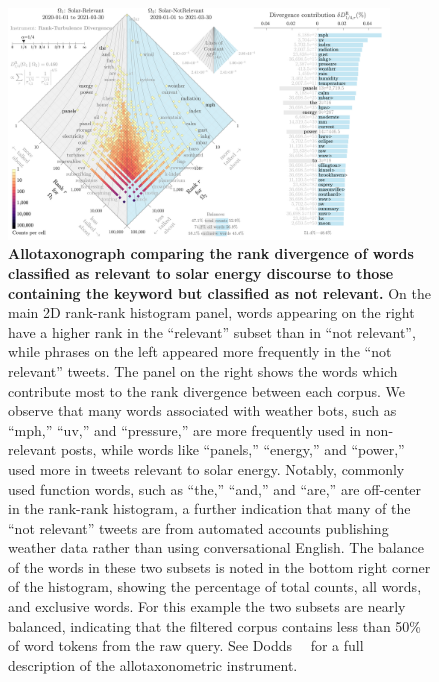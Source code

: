 \begin{figure}
  \centering	
    \includegraphics[width=0.90\textwidth]{figures/figallotaxonometer9000-2021-03-30-2021-03-30-rank-div-alpha-third-Solar_Solar_noname.png}  
  \caption{\textbf{Allotaxonograph comparing the rank divergence of words
    classified as relevant to solar energy discourse
    to those containing the keyword 
    but classified as not relevant.} 
    On the main 2D rank-rank histogram panel,
    words appearing on the right have a higher rank in the ``relevant'' subset than in ``not relevant'', while phrases on the left appeared more frequently in the ``not relevant'' tweets.
    The panel on the right shows the words which contribute most to the rank divergence between each corpus.
    We observe that many words associated with weather bots,
    such as ``mph,'' ``uv,'' and ``pressure,'' 
    are more frequently used in non-relevant posts,
    while words like ``panels,'' ``energy,'' and ``power,'' used more in tweets relevant to solar energy.
    Notably, commonly used function words,
    such as ``the,'' ``and,'' and ``are,'' 
    are off-center in the rank-rank histogram, a further indication that many of the ``not relevant'' tweets are from automated accounts publishing weather data rather than using conversational English.
    The balance of the words in these two subsets is noted in the bottom right corner of the histogram, showing the percentage of total counts, all words, and exclusive words. 
    For this example the two subsets are nearly balanced, indicating that the filtered corpus contains less than 50\% of word tokens from the raw query.
    See Dodds~\etal~\cite{dodds2020allotaxonometry} for a full description of the allotaxonometric instrument.}
    \label{fig:rankdiv_solar}
\end{figure}


